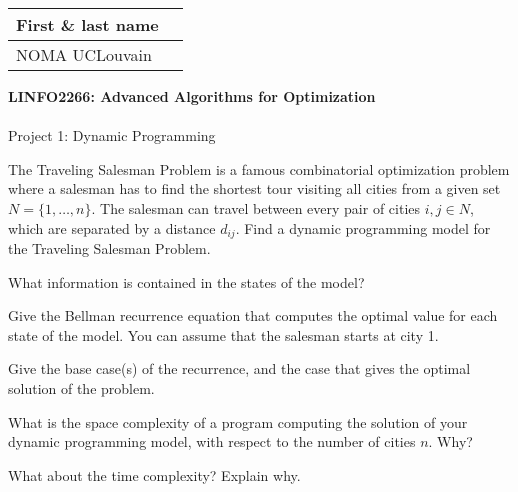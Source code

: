 \documentclass[12pt]{report}
\newcommand{\answerbox}[2]{\hfill\break\\
        \framebox[\linewidth]{\parbox[c][#1][c]{\dimexpr\linewidth-2\fboxsep-2\fboxrule}{#2}}
}
\begin{document}
\hfill
\begingroup
\Large
\begin{tabular}{|l|p{6cm}|}
	\hline
	First \& last name &
	\\ \hline
	NOMA UCLouvain & 
	\\ \hline
\end{tabular}
\endgroup
\vspace{1.5cm}

\noindent
\begingroup
	\Large
	\textbf{LINFO2266: Advanced Algorithms for Optimization}\\\\
	Project 1: Dynamic Programming
\endgroup
\vspace{0.2cm}

\begin{Exercise}[title={Modeling the Traveling Salesman Problem}]

The Traveling Salesman Problem is a famous combinatorial optimization problem where a salesman has to find the shortest tour visiting all cities from a given set $N=\{1,\ldots,n\}$.
The salesman can travel between every pair of cities $i,j \in N$, which are separated by a distance $d_{ij}$.
Find a dynamic programming model for the Traveling Salesman Problem.

\Question What information is contained in the states of the model?
\answerbox{1cm}{
}

\Question Give the Bellman recurrence equation that computes the optimal value for each state of the model. You can assume that the salesman starts at city 1.
\answerbox{1cm}{
}

\Question Give the base case(s) of the recurrence, and the case that gives the optimal solution of the problem.
\answerbox{1cm}{
}

\Question What is the space complexity of a program computing the solution of your dynamic programming model, with respect to the number of cities $n$. Why?
\answerbox{1cm}{
}

\Question What about the time complexity? Explain why.
\answerbox{1cm}{
}

\end{Exercise}
\end{document}
